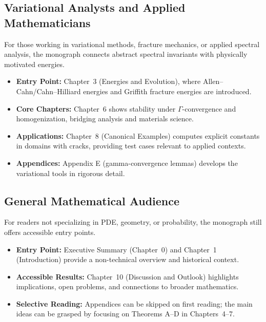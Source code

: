 \subsection*{Variational Analysts and Applied Mathematicians}

For those working in variational methods, fracture mechanics, or
applied spectral analysis, the monograph connects abstract spectral
invariants with physically motivated energies.

\begin{itemize}
  \item \textbf{Entry Point:} Chapter~3 (Energies and Evolution), where
  Allen–Cahn/Cahn–Hilliard energies and Griffith fracture energies are
  introduced.

  \item \textbf{Core Chapters:} Chapter~6 shows stability under
  $\Gamma$-convergence and homogenization, bridging analysis and
  materials science.

  \item \textbf{Applications:} Chapter~8 (Canonical Examples) computes
  explicit constants in domains with cracks, providing test cases
  relevant to applied contexts.

  \item \textbf{Appendices:} Appendix E (gamma-convergence lemmas)
  develops the variational tools in rigorous detail.
\end{itemize}

\subsection*{General Mathematical Audience}

For readers not specializing in PDE, geometry, or probability, the
monograph still offers accessible entry points.

\begin{itemize}
  \item \textbf{Entry Point:} Executive Summary (Chapter~0) and Chapter~1
  (Introduction) provide a non-technical overview and historical context.

  \item \textbf{Accessible Results:} Chapter~10 (Discussion and Outlook)
  highlights implications, open problems, and connections to broader
  mathematics.

  \item \textbf{Selective Reading:} Appendices can be skipped on first
  reading; the main ideas can be grasped by focusing on Theorems A–D in
  Chapters~4–7.
\end{itemize}


